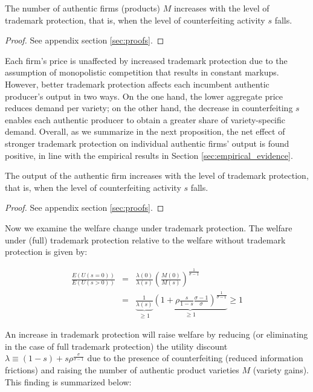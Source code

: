 \documentclass[12pt]{article}
\begin{document}
\begin{proposition} \label{prop:M_s}
The number of authentic firms (products) $M$ increases with the level of trademark protection, that is, when the level of counterfeiting activity $s$ falls.
\end{proposition}

\begin{proof}
See appendix section \ref{sec:proofs}.
\end{proof}

Each firm's price is unaffected by increased trademark protection due to the assumption of monopolistic competition that results in constant markups. However, better trademark protection affects each incumbent authentic producer's output  in two ways. On the one hand, the lower aggregate price reduces demand per variety; on the other hand, the decrease in counterfeiting $s$ enables each authentic producer to obtain a greater share of variety-specific demand. Overall, as we summarize in the next proposition, the net effect of stronger trademark protection on individual authentic firms' output is found positive, in line with the empirical results in Section \ref{sec:empirical_evidence}. 

\begin{proposition} \label{prop:q_s}
The output of the authentic firm increases with the level of trademark protection,  that is, when the level of counterfeiting activity $s$ falls.
\end{proposition}

\begin{proof}
See appendix section \ref{sec:proofs}.
\end{proof}

Now we examine the welfare change under trademark protection. The welfare under (full) trademark protection relative to the welfare without trademark protection is given by:

\begin{eqnarray} \label{eq:expectedutility}
\frac{E(U(s=0))}{E(U(s>0))} &= &\frac{\lambda(0)}{\lambda(s)} \left( \frac{M(0)}{M(s)} \right)^{\frac{1}{\sigma - 1}} \\
&=& \underbrace{\frac{1}{\lambda(s)}}_{\geq 1} \underbrace{\left( 1+\rho \frac{s}{1-s}  \frac{\sigma - 1}{\sigma}   \right)^{\frac{1}{\sigma - 1}}  }_{\geq 1} \geq 1
\nonumber 
\end{eqnarray}

An increase in trademark protection will raise welfare by reducing (or eliminating in the case of full trademark protection) the utility discount $\lambda\equiv(1-s)+s\rho^{\frac{\sigma}{\sigma-1}}$ due to the presence of counterfeiting (reduced information frictions) and raising the number of authentic product varieties $M$  (variety gains). This finding is summarized below:\vspace{0.3cm} 
\end{document}
